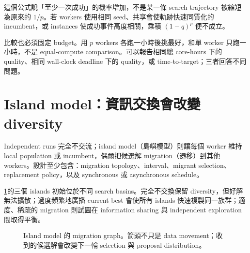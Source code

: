 \documentclass[11pt,a4paper,oneside,openany]{book}
\begin{document}
這個公式說「至少一次成功」的機率增加，不是某一條 search trajectory 被縮短為原來的 $1/p$。若 workers 使用相同 seed、共享會使軌跡快速同質化的 incumbent，或 instances 使成功事件高度相關，乘積 $(1-q)^p$ 便不成立。

比較也必須固定 budget。用 $p$ workers 各跑一小時後挑最好，和單 worker 只跑一小時，不是 equal-compute comparison。可以報告相同總 core-hours 下的 quality、相同 wall-clock deadline 下的 quality，或 time-to-target；三者回答不同問題。

\section{Island model：資訊交換會改變 diversity}

Independent runs 完全不交流；island model（島嶼模型）則讓每個 worker 維持 local population 或 incumbent，偶爾把候選解 migration（遷移）到其他 workers。設計至少包含：migration topology、interval、migrant selection、replacement policy，以及 synchronous 或 asynchronous schedule。

\cref{fig:island-migration}的三個 islands 初始位於不同 search basins。完全不交換保留 diversity，但好解無法擴散；過度頻繁地廣播 current best 會使所有 islands 快速複製同一族群；適度、稀疏的 migration 則試圖在 information sharing 與 independent exploration 間取得平衡。

\begin{figure}[htbp]
\centering
{}
\caption{Island model 的 migration graph。箭頭不只是 data movement；收到的候選解會改變下一輪 selection 與 proposal distribution。}
\label{fig:island-migration}
\end{figure}
\end{document}
